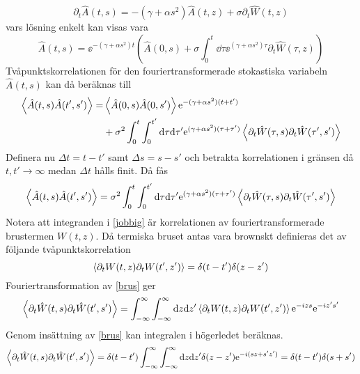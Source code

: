 \begin{equation}
        \partial_{t}\hat{A}(t,s)=-\left(\gamma+\alpha s^2\right)\hat{A}(t,z)+\sigma \partial_{t}\hat{W}(t,z)
\end{equation}
vars lösning enkelt kan visas vara
\begin{equation}
        \hat{A}(t,s)=\ee^{-(\gamma+\alpha s^2)t}\left(\hat{A}(0,s)+\sigma\int_{0}^{t}\dd\tau \ee^{(\gamma+\alpha s^2)\tau}\partial_{t}\hat{W}(\tau,z)\right)
\end{equation}
Tvåpunktskorrelationen för den fouriertransformerade stokastiska variabeln $\hat{A}(t,s)$ kan då beräknas till
\begin{equation}
\begin{aligned}
    \ev{\hat{A}(t,s)\hat{A}(t',s')} =& \ev{\hat{A}(0,s)\hat{A}(0,s')} \ee^{-(\gamma+\alpha s^2)(t+t')}\\ 
    &+ \sigma^2 \int_{0}^{t}\int_{0}^{t'}\dd\tau\dd\tau' \ee^{(\gamma+\alpha s^2)(\tau+\tau')} \ev{\partial_{t}\hat{W}(\tau,s)\partial_{t}\hat{W}(\tau',s')}
\end{aligned}
\end{equation}
Definera nu $\Delta t=t-t'$ samt $\Delta s=s-s'$ och betrakta korrelationen i gränsen då $t,t'\rightarrow\infty$ medan $\Delta t$ hålls finit. Då fås
\begin{equation}\label{jobbig}
     \ev{\hat{A}(t,s)\hat{A}(t',s')}=\sigma^2\int_{0}^{t}\int_{0}^{t'}\dd\tau\dd\tau'\ee^{(\gamma+\alpha s^2)(\tau+\tau')}\ev{\partial_{t}\hat{W}(\tau,s)\partial_{t}\hat{W}(\tau',s')}
\end{equation}
Notera att integranden i \eqref{jobbig} är korrelationen av fouriertransformerade brustermen $W(t,z)$. Då termiska bruset antas vara brownskt definieras det av följande tvåpunktskorrelation
\begin{equation}\label{brus}
    \ev{\partial_{t}W(t,z)\partial_{t}W(t',z')}=\delta(t- t')\delta(z-z')
\end{equation}
Fouriertransformation av \eqref{brus} ger 
\begin{equation}
    \ev{\partial_{t}\hat{W}(t,s)\partial_{t}\hat{W}(t',s')}=\int_{-\infty}^{\infty}\int_{-\infty}^{\infty}\dd z \dd z'\ev{\partial_{t}W(t,z)\partial_{t}W(t',z')}\ee^{-izs}\ee^{-iz's'}
\end{equation}
Genom insättning av \eqref{brus} kan integralen i högerledet beräknas.
\begin{equation}\label{fourbrus}
    \ev{\partial_{t}\hat{W}(t,s)\partial_{t}\hat{W}(t',s')}=\delta(t-t')\int_{-\infty}^{\infty}\int_{-\infty}^{\infty}\dd z \dd z'\delta(z-z')\ee^{-i(sz+s'z')}=\delta(t-t')\delta(s+s')
\end{equation}
